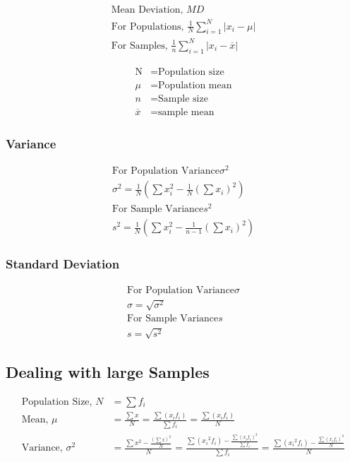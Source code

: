 \documentclass{article}
\begin{document}
\begin{align*}
    \text{Mean Deviation, } MD\\
    \text{For Populations, } \frac{1}{N} \sum_{i = 1}^{N} \left\lvert x_{i} - \mu\right\rvert\\[12pt]
    \text{For Samples, } \frac{1}{n} \sum_{i = 1}^{N} \left\lvert x_{i} - \overline{x}\right\rvert
\end{align*}

\begin{align*}
    \text{N} &= \text{Population size}\\
    \mu &= \text{Population mean}\\
    n &= \text{Sample size}\\
    \overline{x} &= \text{sample mean}
\end{align*}

\subsubsection{Variance}

\begin{align*}
    \text{For Population Variance} \sigma^2\\
    \sigma^2 = \frac{1}{N} \left( \sum x_{i}^2 - \frac{1}{N} {\left(\sum x_{i}\right)}^2 \right)\\[12pt]
    \text{For Sample Variance} s^2\\
    s^2 = \frac{1}{N} \left( \sum x_{i}^2 - \frac{1}{n-1} {\left(\sum x_{i}\right)}^2 \right)
\end{align*}

\subsubsection{Standard Deviation}

\begin{align*}
    \text{For Population Variance} \sigma\\
    \sigma = \sqrt{\sigma^2}\\
    \text{For Sample Variance} s\\
    s = \sqrt{s^2}
\end{align*}

\subsection{Dealing with large Samples}
\begin{align*}
    \text{Population Size, } N &= \sum f_{i} \\[12pt]
    \text{Mean, } \mu &= \frac{\sum x}{N} = \frac{\sum (x_{i}f_{i})}{\sum f_{i}} = \frac{\sum (x_{i}f_{i})}{N} \\[12pt]
    \text{Variance, } \sigma^2 &= \frac{\sum x^2 - \frac{{(\sum x)}^2}{N}}{N} = \frac{\sum ({x_{i}}^2f_{i}) - \frac{{\sum (x_{i}f_{i})}^2}{\sum f_{i}}}{\sum f_{i}} = \frac{\sum ({x_{i}}^2f_{i}) - \frac{{\sum (x_{i}f_{i})}^2}{N}}{N}
\end{align*}
\end{document}
